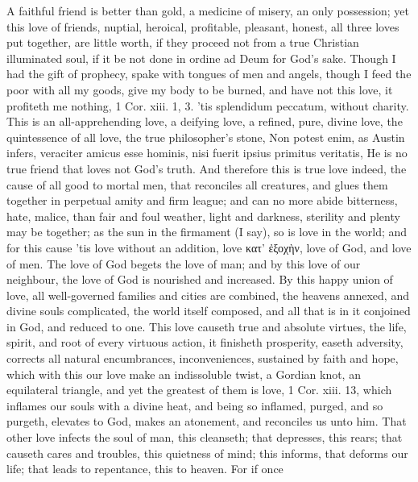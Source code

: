 {A faithful friend is better than gold, a medicine of
misery, an only possession; yet this love of friends, nuptial,
heroical, profitable, pleasant, honest, all three loves put together,
are little worth, if they proceed not from a true Christian illuminated
soul, if it be not done in ordine ad Deum for God's sake. Though I had
the gift of prophecy, spake with tongues of men and angels, though I
feed the poor with all my goods, give my body to be burned, and have
not this love, it profiteth me nothing, 1 Cor. xiii. 1, 3. 'tis
splendidum peccatum, without charity. This is an all-apprehending love,
a deifying love, a refined, pure, divine love, the quintessence of all
love, the true philosopher's stone, Non potest enim, as Austin
infers, veraciter amicus esse hominis, nisi fuerit ipsius primitus
veritatis, He is no true friend that loves not God's truth. And
therefore this is true love indeed, the cause of all good to mortal
men, that reconciles all creatures, and glues them together in
perpetual amity and firm league; and can no more abide bitterness,
hate, malice, than fair and foul weather, light and darkness, sterility
and plenty may be together; as the sun in the firmament (I say), so is
love in the world; and for this cause 'tis love without an addition,
love κατ' ἐξοχὴν, love of God, and love of men. The love of God
begets the love of man; and by this love of our neighbour, the love of
God is nourished and increased. By this happy union of love, all
well-governed families and cities are combined, the heavens annexed,
and divine souls complicated, the world itself composed, and all that
is in it conjoined in God, and reduced to one. This love causeth
true and absolute virtues, the life, spirit, and root of every virtuous
action, it finisheth prosperity, easeth adversity, corrects all natural
encumbrances, inconveniences, sustained by faith and hope, which with
this our love make an indissoluble twist, a Gordian knot, an
equilateral triangle, and yet the greatest of them is love, 1 Cor.
xiii. 13, which inflames our souls with a divine heat, and being
so inflamed, purged, and so purgeth, elevates to God, makes an
atonement, and reconciles us unto him.  That other love infects
the soul of man, this cleanseth; that depresses, this rears; that
causeth cares and troubles, this quietness of mind; this informs, that
deforms our life; that leads to repentance, this to heaven. For if once
}
